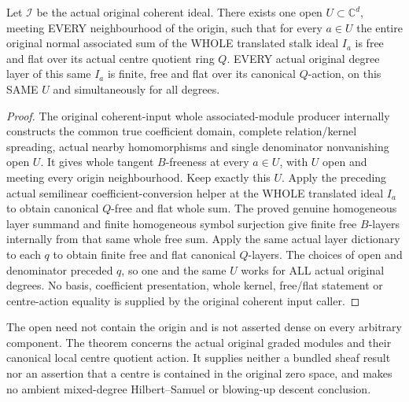 \begin{theorem}
\label{hir:relative-normal-original-nearby-canonical-centre-free-flat-open}
\leanok
Let $\mathcal I$ be the actual original coherent ideal.  There exists one
open $U\subset\mathbb C^d$, meeting EVERY neighbourhood of the origin,
such that for every $a\in U$ the entire original normal associated sum
of the WHOLE translated stalk ideal $I_a$ is free and flat over its actual
centre quotient ring $Q$.  EVERY actual original degree layer of this
same $I_a$ is finite, free and flat over its canonical $Q$-action, on this
SAME $U$ and simultaneously for all degrees.
\end{theorem}
\begin{proof}
The original coherent-input whole associated-module producer internally
constructs the common true coefficient domain, complete relation/kernel
spreading, actual nearby homomorphisms and single denominator nonvanishing
open $U$.  It gives whole tangent $B$-freeness at every $a\in U$, with
$U$ open and meeting every origin neighbourhood.  Keep exactly this $U$.
Apply the preceding actual semilinear coefficient-conversion helper at
the WHOLE translated ideal $I_a$ to obtain canonical $Q$-free and flat
whole sum.  The proved genuine homogeneous layer summand and finite
homogeneous symbol surjection give finite free $B$-layers internally from
that same whole free sum.  Apply the same actual layer dictionary to each
$q$ to obtain finite free and flat canonical $Q$-layers.  The choices
of open and denominator preceded $q$, so one and the same $U$ works for
ALL actual original degrees.  No basis, coefficient presentation, whole
kernel, free/flat statement or centre-action equality is supplied by the
original coherent input caller.
\end{proof}

The open need not contain the origin and is not asserted dense on every
arbitrary component.  The theorem concerns the actual original graded
modules and their canonical local centre quotient action.  It supplies
neither a bundled sheaf result nor an assertion that a centre is contained
in the original zero space, and makes no ambient mixed-degree Hilbert--Samuel
or blowing-up descent conclusion.
